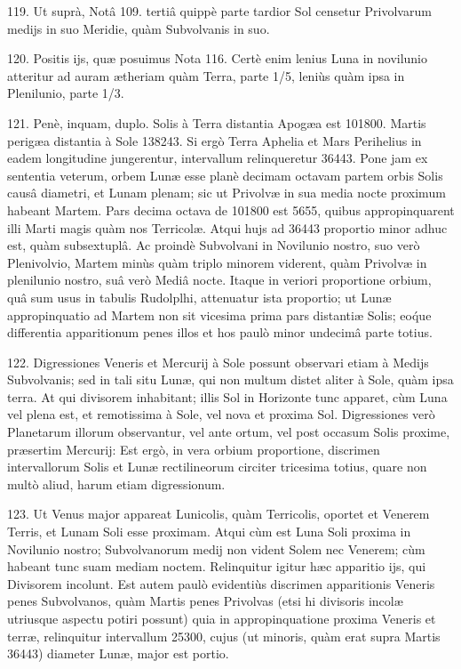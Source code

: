 \documentclass[a4paper, 11pt, oneside, polutonikogreek, german]{article}
\begin{document}
119. Ut suprà, Notâ 109. tertiâ quippè parte tardior Sol censetur Privolvarum medijs in suo Meridie, quàm Subvolvanis in suo.

120. Positis ijs, quæ posuimus Nota 116. Certè enim lenius Luna in novilunio atteritur ad auram ætheriam quàm Terra, parte 1/5, leniùs quàm ipsa in Plenilunio, parte 1/3.

121. Penè, inquam, duplo. Solis à Terra distantia Apogæa est 101800. Martis perigæa distantia à Sole 138243. Si ergò Terra Aphelia et Mars Perihelius in eadem longitudine jungerentur, intervallum relinqueretur 36443. Pone jam ex sententia veterum, orbem Lunæ esse planè decimam octavam partem orbis Solis causâ diametri, et Lunam plenam; sic ut Privolvæ in sua media nocte proximum habeant Martem. Pars decima octava de 101800 est 5655, quibus appropinquarent illi Marti magis quàm nos Terricolæ. Atqui hujs ad 36443 proportio minor adhuc est, quàm subsextuplâ. Ac proindè Subvolvani in Novilunio nostro, suo verò Plenivolvio, Martem minùs quàm triplo minorem viderent, quàm Privolvæ in plenilunio nostro, suâ verò Mediâ nocte.\hspace*{5mm}
Itaque in veriori proportione orbium, quâ sum usus in tabulis Rudolplhi, attenuatur ista proportio; ut Lunæ appropinquatio ad Martem non sit vicesima prima pars distantiæ Solis; eo\'que differentia apparitionum penes illos et hos paulò minor undecimâ parte totius.

122. Digressiones Veneris et Mercurij à Sole possunt observari etiam à Medijs Subvolvanis; sed in tali situ Lunæ, qui non multum distet aliter à Sole, quàm ipsa terra. At qui divisorem inhabitant; illis Sol in Horizonte tunc apparet, cùm Luna vel plena est, et remotissima à Sole, vel nova et proxima Sol. Digressiones verò Planetarum illorum observantur, vel ante ortum, vel post occasum Solis proxime, præsertim Mercurij: Est ergò, in vera orbium proportione, discrimen intervallorum Solis et Lunæ rectilineorum circiter tricesima totius, quare non multò aliud, harum etiam digressionum.

123. Ut Venus major appareat Lunicolis, quàm Terricolis, oportet et Venerem Terris, et Lunam Soli esse proximam. Atqui cùm est Luna Soli proxima in Novilunio nostro; Subvolvanorum medij non vident Solem nec Venerem; cùm habeant tunc suam mediam noctem. Relinquitur igitur hæc apparitio ijs, qui Divisorem incolunt. Est autem paulò evidentiùs discrimen apparitionis Veneris penes Subvolvanos, quàm Martis penes Privolvas (etsi hi divisoris incolæ utriusque aspectu potiri possunt) quia in appropinquatione proxima Veneris et terræ, relinquitur intervallum 25300, cujus (ut minoris, quàm erat supra Martis 36443) diameter Lunæ, major est portio.
\end{document}

